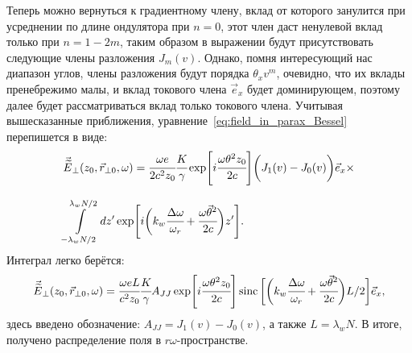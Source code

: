 Теперь можно вернуться к градиентному члену, вклад от которого занулится при усреднении по длине ондулятора при $n = 0$, этот член даст ненулевой вклад только при $n = 1 - 2m$, таким образом в выражении будут присутствовать следующие члены разложения $J_m(v)$. Однако, помня интересующий нас диапазон углов, члены разложения будут порядка $\theta_x v^m$, очевидно, что их вклады пренебрежимо малы, и вклад токового члена $\vec{e}_x$ будет доминирующем, поэтому далее будет рассматриваться вклад только токового члена. Учитывая вышесказанные приближения, уравнение~\ref{eq:field_in_parax_Bessel} перепишется в виде:
\begin{equation}
	\label{eq:field_dist_in_integral}
	\begin{array}{lcl}
		\vec{\widetilde{E}}_{\bot}(z_0,  \vec{r}_{\bot 0}, \omega) =
		\cfrac{\omega e}{2c^2z_0}\cfrac{K}{\gamma}\exp[i\cfrac{\omega \theta^2 z_0}{2c}]
		\bigg(J_1(v) - J_0(v)\bigg)\vec{e}_x\times\\
		\\
		\displaystyle\int\limits_{-\lambda_w N/2}^{\lambda_w N/2} dz'
		\exp[i\bigg(k_w \cfrac{\Delta\omega}{\omega_r} + 
		\cfrac{\omega\vec{\theta}^2}{2c}\bigg)z'].
	\end{array}	
\end{equation}
Интеграл легко берётся:
\begin{equation}
	\label{eq:field_dist_nonNorm}
	\begin{array}{lcl}
		\vec{\widetilde{E}}_{\bot}(z_0,  \vec{r}_{\bot 0}, \omega) =
		\cfrac{\omega eL}{c^2z_0}\cfrac{K}{\gamma}A_{JJ}\exp[i\cfrac{\omega \theta^2 z_0}{2c}]
		\operatorname{sinc} \bigg[\bigg(k_w \cfrac{\Delta\omega}{\omega_r} + 
		\cfrac{\omega\vec{\theta}^2}{2c}\bigg)L/2 \bigg ]\vec{e}_x ,
	\end{array}	
\end{equation}
здесь введено обозначение: $A_{JJ} = J_1(v) - J_0(v)$, а также $L = \lambda_w N$. В итоге, получено распределение поля в $r\omega$-пространстве. 

